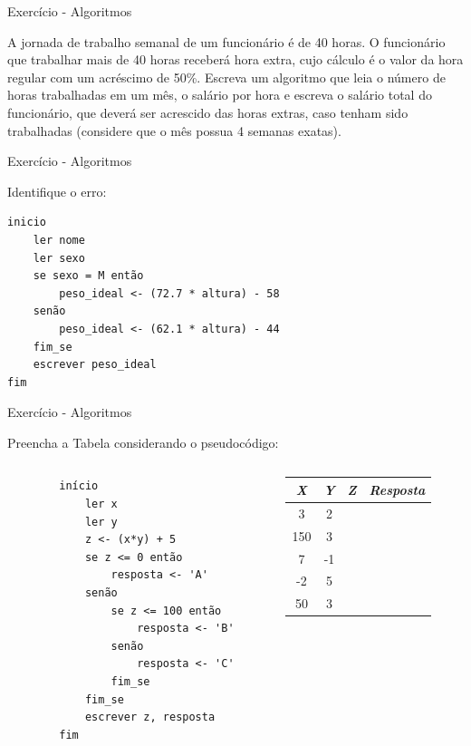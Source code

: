 \documentclass{beamer}
\begin{document}
\begin{frame}{Exercício - Algoritmos}
	\label{exercicio_06}
	
	A jornada de trabalho semanal de um funcionário é de 40 horas. O funcionário que trabalhar mais	de 40 horas receberá hora extra, cujo cálculo é o valor da hora regular com um acréscimo de 50\%.
	Escreva um algoritmo que leia o número de horas trabalhadas em um mês, o salário por hora e escreva o salário total do funcionário, que deverá ser acrescido das horas extras, caso tenham sido trabalhadas (considere que o mês possua 4 semanas exatas).
\end{frame}

\begin{frame}[fragile]{Exercício - Algoritmos}
	\label{exercicio_07}
	
	Identifique o erro:
	\begin{verbatim}
inicio
	ler nome
	ler sexo
	se sexo = M então
		peso_ideal <- (72.7 * altura) - 58
	senão
		peso_ideal <- (62.1 * altura) - 44
	fim_se
	escrever peso_ideal
fim
	\end{verbatim}
\end{frame}


\begin{frame}[fragile]{Exercício - Algoritmos}
	\label{exercicio_08}
	
	Preencha a Tabela considerando o pseudocódigo:
	
\begin{columns}
	\begin{column}{0.5\textwidth}
\begin{verbatim}
		início
			ler x
			ler y
			z <- (x*y) + 5
			se z <= 0 então
				resposta <- 'A'
			senão
				se z <= 100 então
					resposta <- 'B'
				senão
					resposta <- 'C'
				fim_se
			fim_se
			escrever z, resposta
		fim
\end{verbatim}
	\end{column}
	\begin{column}{0.5\textwidth}
		\begin{tabular}{|c|c|c|c|}
			\hline
			 \textbf{\textit{X}} & \textbf{\textit{Y}} & \textbf{\textit{Z}} & \textbf{\textit{Resposta}} \\
			\hline 
			3 & 2 & & \\
			\hline 
			150 & 3 & & \\
			\hline 
			7 & -1 & & \\
			\hline 
			-2 & 5 & & \\
			\hline 
			50 & 3 & & \\
			\hline
		\end{tabular}
	\end{column}
\end{columns}
\end{frame}
\end{document}
